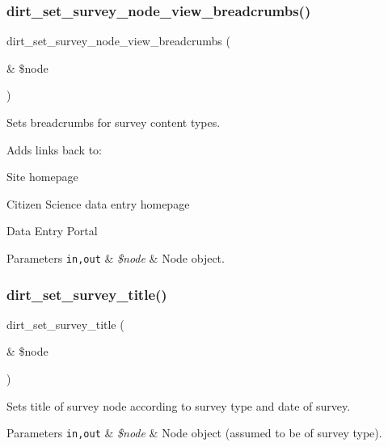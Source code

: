 \subsubsection{\texorpdfstring{dirt\+\_\+set\+\_\+survey\+\_\+node\+\_\+view\+\_\+breadcrumbs()}{dirt\_set\_survey\_node\_view\_breadcrumbs()}}
{\footnotesize\ttfamily dirt\+\_\+set\+\_\+survey\+\_\+node\+\_\+view\+\_\+breadcrumbs (\begin{DoxyParamCaption}\item[{\&}]{\$node }\end{DoxyParamCaption})}

Sets breadcrumbs for survey content types.

Adds links back to\+:
\begin{DoxyItemize}
\item Site homepage
\item Citizen Science data entry homepage
\item Data Entry Portal
\end{DoxyItemize}


\begin{DoxyParams}[1]{Parameters}
\mbox{\tt in,out}  & {\em \$node} & Node object. \\
\hline
\end{DoxyParams}
\mbox{\label{dirt_8nodes_8inc_a2d57703b53cc2810f86c61fc63f803fa}} 
\subsubsection{\texorpdfstring{dirt\+\_\+set\+\_\+survey\+\_\+title()}{dirt\_set\_survey\_title()}}
{\footnotesize\ttfamily dirt\+\_\+set\+\_\+survey\+\_\+title (\begin{DoxyParamCaption}\item[{\&}]{\$node }\end{DoxyParamCaption})}

Sets title of survey node according to survey type and date of survey.


\begin{DoxyParams}[1]{Parameters}
\mbox{\tt in,out}  & {\em \$node} & Node object (assumed to be of survey type). \\
\hline
\end{DoxyParams}
